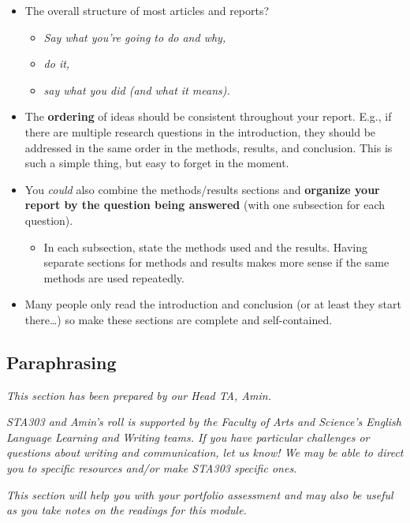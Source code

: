 \documentclass[
  openany]{book}
\providecommand{\tightlist}{%
  \setlength{\itemsep}{0pt}\setlength{\parskip}{0pt}}
\begin{document}
\begin{itemize}
\tightlist
\item
  The overall structure of most articles and reports?

  \begin{itemize}
  \tightlist
  \item
    \emph{Say what you're going to do and why,}
  \item
    \emph{do it,}
  \item
    \emph{say what you did (and what it means).}
  \end{itemize}
\item
  The \textbf{ordering} of ideas should be consistent throughout your report.
  E.g., if there are multiple research questions in the introduction, they should be addressed in the same order in the methods, results, and conclusion. This is such a simple thing, but easy to forget in the moment.
\item
  You \emph{could} also combine the methods/results sections and \textbf{organize your report by the question being answered} (with one subsection for each question).

  \begin{itemize}
  \tightlist
  \item
    In each subsection, state the methods used and the results.
    Having separate sections for methods and results makes more sense if the same methods are used repeatedly.
  \end{itemize}
\item
  Many people only read the introduction and conclusion (or at least they start there\ldots) so make these sections are complete and self-contained.
\end{itemize}

\hypertarget{paraphrasing}{%
\subsection{Paraphrasing}\label{paraphrasing}}

\emph{This section has been prepared by our Head TA, Amin.}

\emph{STA303 and Amin's roll is supported by the Faculty of Arts and Science's English Language Learning and Writing teams. If you have particular challenges or questions about writing and communication, let us know! We may be able to direct you to specific resources and/or make STA303 specific ones.}

\emph{This section will help you with your portfolio assessment and may also be useful as you take notes on the readings for this module.}
\end{document}
